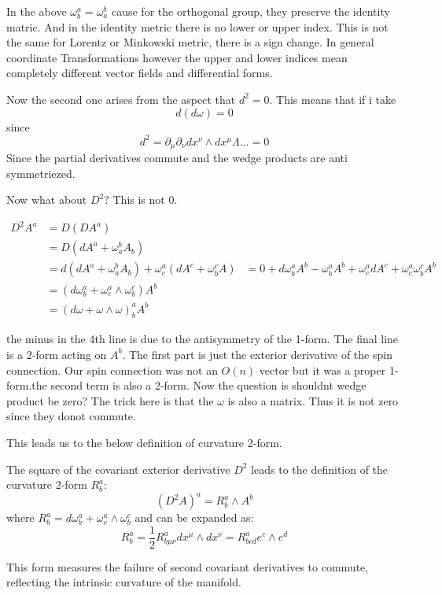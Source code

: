 \documentclass{article}
\begin{document}
In the above \(\omega^a_b = \omega^b_a \) cause for the orthogonal group, they preserve the identity matric. And in the identity metric there is no lower or upper index. This is not the same for Lorentz or Minkowski metric, there is a sign change. In general coordinate Transformations however the upper and lower indices mean completely different vector fields and differential forms.  

Now the second one arises from the aspect that \(d^2 = 0\). This means that if i take 
\[ d(d\omega) = 0\]
since 
\[ d^2 = \partial_\mu \partial_\nu dx^\nu \wedge dx^\mu \Lambda \dots = 0 \]
Since the partial derivatives commute and the wedge products are anti symmetriezed. 

Now what about \( D^2 ?\) This is not 0. 

\begin{align*}
    D^2 A^a &= D(DA^a) \\ 
            &= D(dA^a+ \omega_a^b A_b) \\ 
            &= d(dA^a + \omega_a^b A_b) + \omega^a_c (dA^c + \omega^c_b A) 
            &= 0 + d\omega^a_b A^b - \omega^a_b A^b + \omega^a_c dA^c + \omega^a_c \omega^c_b A^b \\  
            &= (d \omega^a_b + \omega^a_c \wedge \omega^c_b )A^b \\
            &= (d \omega + \omega \wedge \omega )^a_b A^b
\end{align*}

the minus in the 4th line is due to the antisymmetry of the 1-form. The final line is a 2-form acting on \( A^b \). The first part is just the exterior derivative of the spin connection. Our spin connection was not an \( O(n) \) vector but it was a proper 1-form.the second term is also a 2-form. Now the question is shouldnt wedge product be zero? The trick here is that the \( \omega\) is also a matrix. Thus it is not zero since they donot commute. 

This leads us to the below definition of curvature 2-form.

\begin{theorem}
The square of the covariant exterior derivative \(D^2\) leads to the definition of the curvature 2-form \(R^a_b\):
\[
(D^2 A)^a = R^a_b \wedge A^b
\]
where \(R^a_b = d\omega^a_b + \omega^a_c \wedge \omega^c_b\) and can be expanded as:
\[
R^a_b = \frac{1}{2} R^a_{b\mu\nu} dx^\mu \wedge dx^\nu = R^a_{bcd} e^c \wedge e^d
\]

\end{theorem}
This form measures the failure of second covariant derivatives to commute, reflecting the intrinsic curvature of the manifold.
\end{document}
